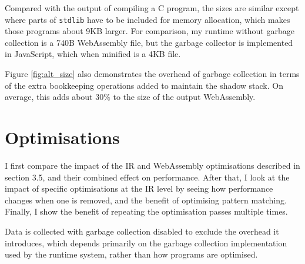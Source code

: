 Compared with the output of compiling a C program, the sizes are similar except where parts of \verb|stdlib| have to be included for memory allocation, which makes those programs about 9KB larger. For comparison, my runtime without garbage collection is a 740B WebAssembly file, but the garbage collector is implemented in JavaScript, which when minified is a 4KB file.

Figure \ref{fig:alt_size} also demonstrates the overhead of garbage collection in terms of the extra bookkeeping operations added to maintain the shadow stack. %
On average, this adds about 30\% to the size of the output WebAssembly. %

\section{Optimisations}

I first compare the impact of the IR and WebAssembly optimisations described in section 3.5, and their combined effect on performance. After that, I look at the impact of specific optimisations at the IR level by seeing how performance changes when one is removed, and the benefit of optimising pattern matching. Finally, I show the benefit of repeating the optimisation passes multiple times. %

Data is collected with garbage collection disabled to exclude the overhead it introduces, which depends primarily on the garbage collection implementation used by the runtime system, rather than how programs are optimised.


